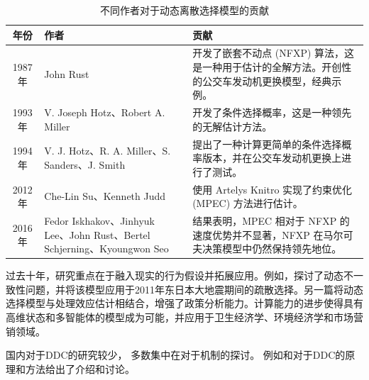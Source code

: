 \documentclass[a4paper,12pt,oneside, fontset=mac]{ctexbook} %
\begin{document}
\begin{table}[!ht]
\centering
\caption{不同作者对于动态离散选择模型的贡献}
\label{tab:不同作者对于动态离散选择模型的贡献}
\begin{tabularx}{\textwidth}{@{}cXX@{}} 
\toprule
\textbf{年份} & \textbf{作者} & \textbf{贡献}\\
\midrule
1987年 &John Rust &开发了嵌套不动点 (NFXP) 算法，这是一种用于估计的全解方法。开创性的公交车发动机更换模型，经典示例。\\
1993年 &V. Joseph Hotz、Robert A. Miller &开发了条件选择概率，这是一种领先的无解估计方法。\\
1994年 &V. J. Hotz、R. A. Miller、S. Sanders、J. Smith &提出了一种计算更简单的条件选择概率版本，并在公交车发动机更换上进行了测试。\\
2012年 &Che-Lin Su、Kenneth Judd &使用 Artelys Knitro 实现了约束优化 (MPEC) 方法进行估计。 \\
2016 年 &Fedor Iskhakov、Jinhyuk Lee、John Rust、Bertel Schjerning、Kyoungwon Seo &结果表明，MPEC 相对于 NFXP 的速度优势并不显著，NFXP 在马尔可夫决策模型中仍然保持领先地位。\\
\bottomrule
\end{tabularx}
\end{table}


过去十年，研究重点在于融入现实的行为假设并拓展应用。例如，\cite{utaraDynamicDiscreteChoice2024}探讨了动态不一致性问题，并将该模型应用于2011年东日本大地震期间的疏散选择。另一篇\cite{heckmanDynamicDiscreteChoice2007}将动态选择模型与处理效应估计相结合，增强了政策分析能力。计算能力的进步使得具有高维状态和多智能体的模型成为可能，并应用于卫生经济学、环境经济学和市场营销领域。


国内对于DDC的研究较少，
多数集中在对于机制的探讨。
例如\cite{QinSongDongTaiChiSanXuanZeMoXingJiQiGuJiFangFaFaZhanZongShu2010}和\cite{MaYaQiDongTaiChiSanXuanZeMoXingDeMoNiFenXi2016}对于DDC的原理和方法给出了介绍和讨论。
\end{document}
